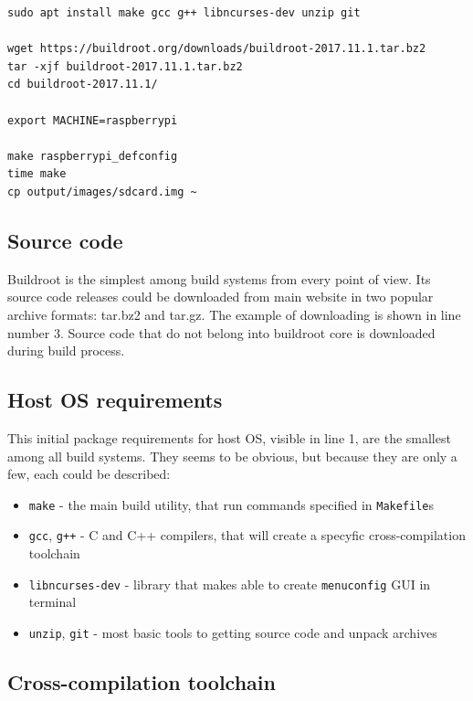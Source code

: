 \documentclass[printmode]{mgr}
\begin{document}

\begin{lstlisting}
sudo apt install make gcc g++ libncurses-dev unzip git 

wget https://buildroot.org/downloads/buildroot-2017.11.1.tar.bz2
tar -xjf buildroot-2017.11.1.tar.bz2
cd buildroot-2017.11.1/

export MACHINE=raspberrypi

make raspberrypi_defconfig
time make
cp output/images/sdcard.img ~
\end{lstlisting}



\subsection*{Source code}

Buildroot is the simplest among build systems from every point of view.
Its source code releases could be downloaded from main website in two popular archive formats: tar.bz2 and tar.gz.
The example of downloading is shown in line number 3.
Source code that do not belong into buildroot core is downloaded during build process.

\subsection*{Host OS requirements}

This initial package requirements for host OS, visible in line 1, are the smallest among all build systems.
They seems to be obvious, but because they are only a few, each could be described:

\begin{itemize}
    \item \verb|make| - the main build utility, that run commands specified in \verb|Makefile|s
    \item \verb|gcc|, \verb|g++| - C and C++ compilers, that will create a specyfic cross-compilation toolchain
    \item \verb|libncurses-dev| - library that makes able to create \verb|menuconfig| GUI in terminal
    \item \verb|unzip|, \verb|git| - most basic tools to getting source code and unpack archives
\end{itemize}

\subsection*{Cross-compilation toolchain}
\end{document}
